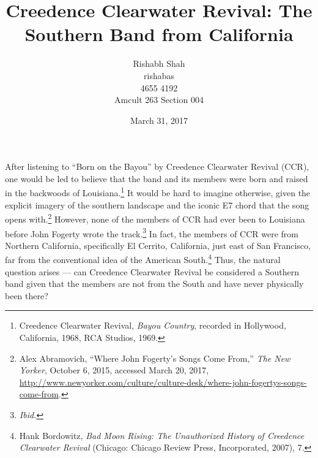 \documentclass[10pt]{article}
\begin{document}
\title{Creedence Clearwater Revival: The Southern Band from California}

\author{
	Rishabh Shah\\
	rishabas\\
	4655 4192\\
	Amcult 263 Section 004}

\date{March 31, 2017}

\maketitle
\thispagestyle{empty}

\newpage
\clearpage
{}
\doublespacing

After listening to ``Born on the Bayou'' by Creedence Clearwater Revival (CCR), one would be led to believe that the band and its members were born and raised in the backwoods of Louisiana.\footnote{Creedence Clearwater Revival, \textit{Bayou Country}, recorded in Hollywood, California, 1968, RCA Studios, 1969.} It would be hard to imagine otherwise, given the explicit imagery of the southern landscape and the iconic E7 chord that the song opens with.\footnote{Alex Abramovich, ``Where John Fogerty's Songs Come From,'' \textit{The New Yorker}, October 6, 2015, accessed March 20, 2017, \url{http://www.newyorker.com/culture/culture-desk/where-john-fogertys-songs-come-from}.} However, none of the members of CCR had ever been to Louisiana before John Fogerty wrote the track.\footnote{\textit{Ibid.}} In fact, the members of CCR were from Northern California, specifically El Cerrito, California, just east of San Francisco, far from the conventional idea of the American South.\footnote{Hank Bordowitz, \textit{Bad Moon Rising: The Unauthorized History of Creedence Clearwater Revival} (Chicago: Chicago Review Press, Incorporated, 2007), 7.} Thus, the natural question arises --- can Creedence Clearwater Revival be considered a Southern band given that the members are not from the South and have never physically been there?
\end{document}
